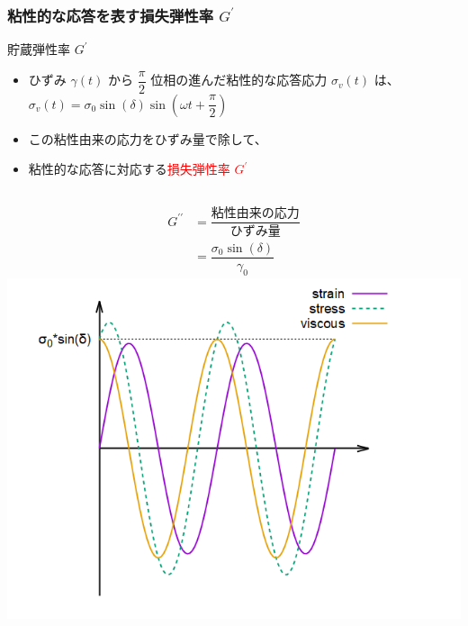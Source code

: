 \documentclass[12pt, dvipdfmx]{beamer}
\begin{document}
\begin{frame}
    \frametitle{粘性的な応答を表す損失弾性率 $G^{\prime}$}
		
		\begin{block}{貯蔵弾性率 $G^{\prime}$}
			\begin{itemize}
				\item ひずみ $\gamma(t)$ から $\dfrac{\pi}{2}$ 位相の進んだ粘性的な応答応力 $\sigma_v(t)$ は、
				$\sigma_v(t) = \sigma_0 \sin(\delta)\sin(\omega t + \dfrac{\pi}{2})$
				\item この粘性由来の応力をひずみ量で除して、
				\item 粘性的な応答に対応する\textcolor{red}{損失弾性率 $G^{\prime}$}
			\end{itemize}
			\begin{columns}[c, onlytextwidth]
						\begin{align*}
							G^{\prime \prime} &= \dfrac{\text{粘性由来の応力}}{\text{ひずみ量}} \\
							&= \dfrac{\sigma_0 \sin(\delta)}{\gamma_0}
						\end{align*}
					\centering
					\includegraphics[width=.9\textwidth]{dynamic_rheo/dyn_rheo_visco.png}
			\end{columns}
		\end{block}
\end{frame}
\end{document}
